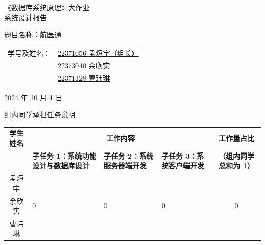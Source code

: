 \documentclass{article}
\begin{document}
\begin{center}
    \vspace*{3cm} %
    {\Huge 《数据库系统原理》大作业 \\[1cm]}
    {\LARGE 系统设计报告 \\[5cm]}
\end{center}

\begin{center}
    {\Large 题目名称：航医通} \\[4cm]
\end{center}

\begin{center}
    \begin{tabular}{ll}
        {\Large 学号及姓名：} & {\Large \underline{22371056 孟烜宇（组长）}} \\[0.5cm]
        & {\Large \underline{22373040 余欣实}} \\[0.5cm]
        & {\Large \underline{22371328 曹玮琳}} \\[3cm]
    \end{tabular}
\end{center}

\begin{center}
    {\Large 2024\hspace{0.35cm} 年 \hspace{0.35cm} 10\hspace{0.35cm} 月 \hspace{0.35cm} 4\hspace{0.35cm} 日}
\end{center}

\newpage

\begin{center}
    \vspace*{3cm}
    \LARGE 组内同学承担任务说明
\end{center}

\vspace{2.5cm}

\begin{center}
\renewcommand{\arraystretch}{3} %
\setlength{\tabcolsep}{10pt} %
\small %
\begin{tabular}{|c|p{2cm}|p{2cm}|p{2cm}|c|}
    \hline
    \textbf{学生姓名} & \multicolumn{3}{c|}{\textbf{工作内容}} & \textbf{工作量占比} \\ 
    \cline{2-4}
     & \textbf{子任务 1：系统功能设计与数据库设计} & \textbf{子任务 2：系统服务器端开发} & \textbf{子任务 3：系统客户端开发} & \textbf{（组内同学总和为 1）} \\
    \hline
    孟烜宇& & & & \\
    \hline
    余欣实& 0 & 0 & 0 & 0 \\
    \hline
    曹玮琳& & & & \\
    \hline
\end{tabular}
\end{center}
\end{document}
